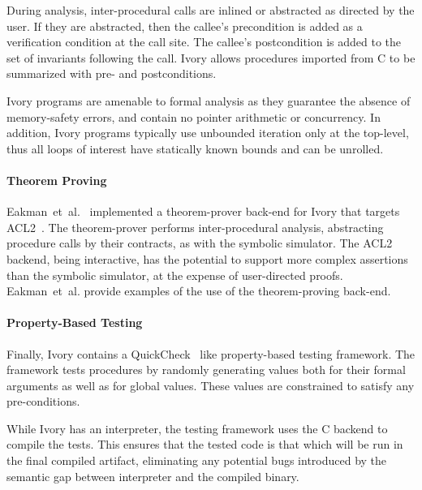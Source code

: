 During analysis, inter-procedural calls are inlined or abstracted as
directed by the user. If they are abstracted, then the callee's
precondition is added as a verification condition at the call
site. The callee's postcondition is added to the set of invariants
following the call. Ivory allows procedures imported from C to be
summarized with pre- and postconditions.

Ivory programs are amenable to formal analysis as they guarantee the
absence of memory-safety errors, and contain no pointer arithmetic or
concurrency.  In addition, Ivory programs typically use unbounded
iteration only at the top-level, thus all loops of interest have
statically known bounds and can be unrolled.



\paragraph{Theorem Proving}

Eakman~et~al.~\cite{ivory-acl2} implemented a theorem-prover back-end
for Ivory that targets ACL2~\cite{acl}. The theorem-prover performs
inter-procedural analysis, abstracting procedure calls by their
contracts, as with the symbolic simulator. The ACL2 backend, being
interactive, has the potential to support more complex assertions than
the symbolic simulator, at the expense of user-directed
proofs. Eakman~et~al. provide examples of the use of the
theorem-proving back-end.

\paragraph{Property-Based Testing}

Finally, Ivory contains a QuickCheck~\cite{qc} like property-based
testing framework.  The framework tests procedures by randomly
generating values both for their formal arguments as well as for
global values. These values are constrained to satisfy any
pre-conditions.  

While Ivory has an interpreter, the testing framework uses the C
backend to compile the tests.  This ensures that the tested code is
that which will be run in the final compiled artifact, eliminating any
potential bugs introduced by the semantic gap between interpreter and
the compiled binary.


